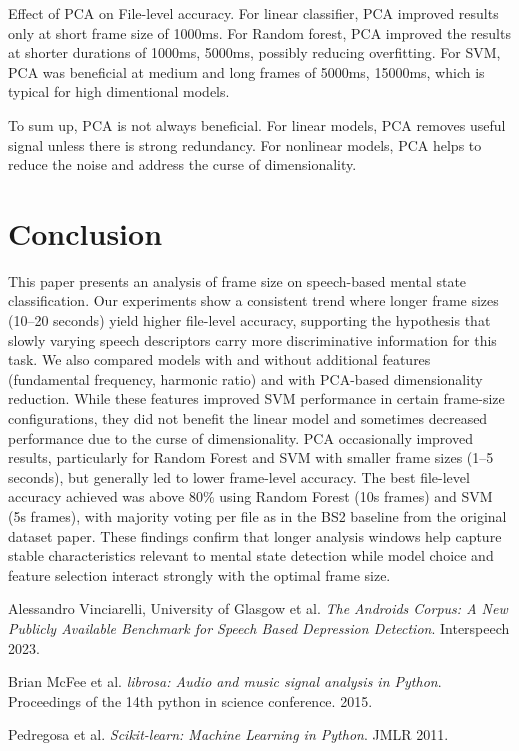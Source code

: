 \documentclass[conference]{IEEEtran}
\begin{document}
Effect of PCA on File-level accuracy.
For linear classifier, PCA improved results only at short frame size of 1000ms.
For Random forest, PCA improved the results at shorter durations of 1000ms, 5000ms, possibly reducing overfitting.
For SVM, PCA was beneficial at medium and long frames of 5000ms, 15000ms, which is typical for high dimentional models.

To sum up, PCA is not always beneficial. 
For linear models, PCA removes useful signal unless there is strong redundancy.
For nonlinear models, PCA helps to reduce the noise and address the curse of dimensionality.

\section{Conclusion}
This paper presents an analysis of frame size on speech-based mental state classification. 
Our experiments show a consistent trend where longer frame sizes (10–20 seconds) yield higher file-level accuracy, supporting the hypothesis that slowly varying speech descriptors carry more discriminative information for this task.
We also compared models with and without additional features (fundamental frequency, harmonic ratio) and with PCA-based dimensionality reduction. 
While these features improved SVM performance in certain frame-size configurations, they did not benefit the linear model and sometimes decreased performance due to the curse of dimensionality. 
PCA occasionally improved results, particularly for Random Forest and SVM with smaller frame sizes (1–5 seconds), but generally led to lower frame-level accuracy.
The best file-level accuracy achieved was above 80\% using Random Forest (10s frames) and SVM (5s frames), with majority voting per file as in the BS2 baseline from the original dataset paper. 
These findings confirm that longer analysis windows help capture stable characteristics relevant to mental state detection while model choice and feature selection interact strongly with the optimal frame size.

\begin{thebibliography}{9}
Alessandro Vinciarelli, University of Glasgow et al. \textit{The Androids Corpus: A New Publicly Available Benchmark for Speech Based Depression Detection}. Interspeech 2023.

Brian McFee et al. \textit{librosa: Audio and music signal analysis in Python}. Proceedings of the 14th python in science conference. 2015.

Pedregosa et al. \textit{Scikit-learn: Machine Learning in Python}. JMLR 2011.

\end{thebibliography}
\end{document}
